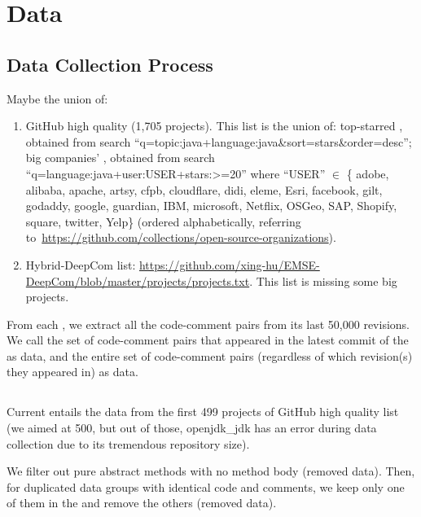 \section{Data}
\label{sec:data}

\subsection{Data Collection Process}

 Maybe the union of:

\begin{enumerate}
\item GitHub high quality \repos (1,705 projects).  This list is the
  union of: top-starred \repos, obtained from search
  ``q=topic:java+language:java\&sort=stars\&order=desc''; big
  companies' \repos, obtained from search
  ``q=language:java+user:USER+stars:>=20'' where ``USER'' $\in$ \{
  adobe, alibaba, apache, artsy, cfpb, cloudflare, didi, eleme, Esri,
  facebook, gilt, godaddy, google, guardian, IBM, microsoft, Netflix,
  OSGeo, SAP, Shopify, square, twitter, Yelp\} (ordered
  alphabetically, referring
  to~\url{https://github.com/collections/open-source-organizations}).
\item Hybrid-DeepCom list:
  \url{https://github.com/xing-hu/EMSE-DeepCom/blob/master/projects/projects.txt}.
  This list is missing some big projects.
\end{enumerate}

From each \repo, we extract all the code-comment pairs from its last
50,000 revisions.  We call the set of code-comment pairs that appeared
in the latest commit of the \repo as \lat data, and the entire set of
code-comment pairs (regardless of which revision(s) they appeared in)
as \evo data.

\subsection{\DataSets}

Current \dataset entails the data from the first 499 projects of
GitHub high quality \repos list (we aimed at 500, but out of those,
openjdk\_jdk has an error during data collection due to its tremendous
repository size).

We filter out pure abstract methods with no method body (removed
 data).  Then, for duplicated
data groups with identical code and comments, we keep only one of them
in the \dataset and remove the others (removed
 data).

